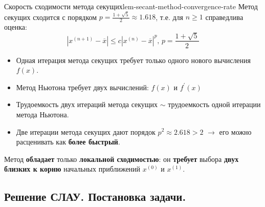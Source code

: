 \documentclass[14pt]{extarticle}
\begin{document}
    \clearpage
    \begin{lemma}{Скорость сходимости метода секущих}{lem-secant-method-convergence-rate}
        Метод секущих сходится с порядком $p = \frac{1 + \sqrt{5}}{2} \approx 1.618$, т.е. для $n \geq 1$ справедлива оценка:
        $$|x^{(n + 1)} - \overline{x}| \leq c|x^{(n)} - \overline{x}|^{p} \text{, } p = \frac{1 + \sqrt{5}}{2}$$

        \begin{itemize}
            \item Одная итерация метода секущих требует только одного нового вычисления $f(x)$.
            \item Метод Ньютона требует двух вычислений: $f(x)$ и $f^{'}(x)$
            \item Трудоемкость двух итераций метода секущих $\sim$ трудоемкость одной итерации метода Ньютона.
            \item Две итерации метода секущих дают порядок $p^{2} \approx 2.618 > 2$ $\rightarrow$ его можно расценивать как \textbf{более быстрый}.
        \end{itemize}
    \end{lemma}

    Метод \textbf{обладает} только \textbf{локальной сходимостью}: он \textbf{требует} выбора \textbf{двух близких к корню} начальных приближений $x^{(0)}$ и $x^{(1)}$.

\clearpage
\subsection{Решение СЛАУ. Постановка задачи.}
\end{document}
